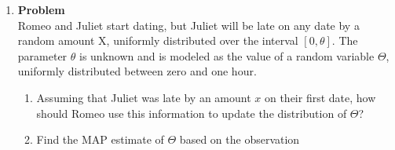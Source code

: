 \documentclass[12pt]{article}
\newenvironment{Ex}{\textbf{Problem}\vspace{.75em}\\}{}
\newcommand{\dd}[1]{\:\mathrm{d}{#1}}
\begin{document}
\begin{enumerate}
\begin{Ex}
\begin{solution}
\begin{enumerate}
\begin{equation}
        \end{equation}
        Which we can obtain by integrating the expected values
        piecewise
        \begin{equation}
          \label{eq:3b-mse-piecewise}
          E[(X-E[X|Y])^2|Y] = \left\{
            \begin{aligned}
              & \int_{2}^{y}
              (x-\frac{y+2}{2})^2\left(\frac{1}{y-2}\right) \dd{x}
              &&\quad 2 \le x \le 3 \\
              & \int_{y-1}^{y} \left(x-y+\frac{1}{2}\right)^2(1) \dd{x}
              &&\quad 3 < x < 11 \\
              & \int_{y-1}^{12}
              \left(x-\frac{y+11}{2}\right)^2\left(\frac{1}{13-y}\right) \dd{x}
              &&\quad 11 \le x \le 12 \\
            \end{aligned} \right.
        \end{equation}
        Which turns out to be
        \begin{equation}
          \label{eq:3b-mse-piecewise-sol}
          \implies E[(X-E[X|Y])^2|Y] = \left\{
            \begin{aligned}
              & \frac{(y-2)^2}{12}
              &&\quad 2 \le x \le 3 \\
              & \frac{1}{12}
              &&\quad 3 < x < 11 \\
              & \frac{(y-13)^2}{12}
              &&\quad 11 \le x \le 12 \\
            \end{aligned} \right.
        \end{equation}
      \end{enumerate}
    \end{solution}
  \end{Ex}
\item
  \begin{Ex}
    Romeo and Juliet start dating, but Juliet will be late on any date
    by a random amount X, uniformly distributed over the interval $[0,
    \theta]$. The parameter $\theta$ is unknown and is modeled as the
    value of a random variable $\Theta$, uniformly distributed between
    zero and one hour.
    \begin{enumerate}
    \item Assuming that Juliet was late by an amount $x$ on their
      first date, how should Romeo use this information to update the
      distribution of $\Theta$?
    \item Find the MAP estimate of $\Theta$ based on the observation

\end{enumerate}
\end{Ex}
\end{enumerate}
\end{document}
